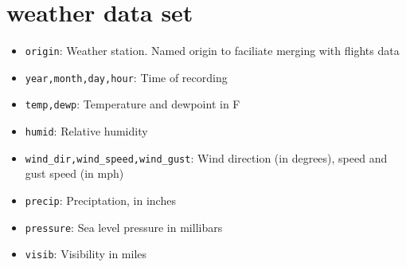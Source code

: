 \documentclass{article}
\begin{document}
\section{weather data set}
\begin{itemize}
	\item \texttt{origin}: Weather station. Named origin to faciliate merging with flights data
	\item \texttt{year,month,day,hour}: Time of recording
	\item \texttt{temp,dewp}: Temperature and dewpoint in F
	\item \texttt{humid}: Relative humidity
	\item \texttt{wind\_dir,wind\_speed,wind\_gust}: Wind direction (in degrees), speed and gust speed (in mph)
	\item \texttt{precip}: Preciptation, in inches
	\item \texttt{pressure}: Sea level pressure in millibars
	\item \texttt{visib}: Visibility in miles
\end{itemize}
\end{document}
